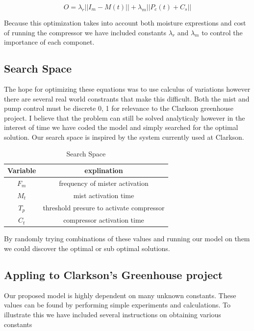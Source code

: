 \documentclass[a4paper,12pt]{article}
\begin{document}
\begin{equation}
		  O = \lambda_r || I_m - M(t) || + \lambda_m || P_c(t) + C_s||
\end{equation}

Because this optimization takes into account both moisture exprestions and cost of running the compressor we have included constants $\lambda_r$ and $\lambda_m$ to control the importance of each componet.


\subsection{Search Space}

The hope for optimizing these equations was to use calculus of variations however there are several real world constrants that make this difficult. Both the mist and pump control must be discrete 0, 1 for relevance to the Clarkson greenhouse project. I believe that the problem can still be solved analyticaly however in the interest of time we have coded the model and simply searched for the optimal solution. Our search space is inspired by the system currently used at Clarkson. 

\begin{table}[ht]
\caption{Search Space}
\centering
\begin{tabular} {c c}
\hline\hline
 Variable & explination \\ [0.5ex]
\hline
$F_m$ & frequency of mister activation \\
$M_t$ & mist activation time \\
$T_p$ & threshold presure to activate compressor \\ 
$C_t$ & compressor activation time \\ 
\hline
\end{tabular}
\end{table}

By randomly trying combinations of these values and running our model on them we could discover the optimal or sub optimal solutions.

\subsection{Appling to Clarkson's Greenhouse project}

Our proposed model is highly dependent on many unknown constants. These values can be found by performing simple experiments and calculations. To illustrate this we have included several instructions on obtaining various constants
\end{document}
